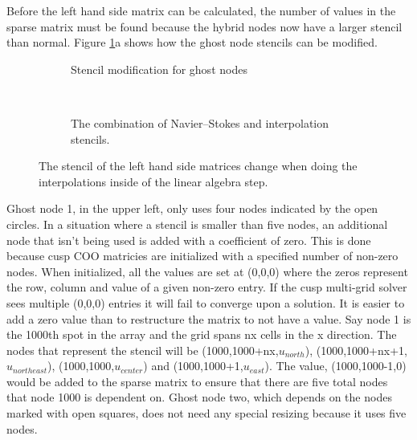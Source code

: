 Before the left hand side matrix can be calculated, the number of values in the sparse matrix must be found because the hybrid nodes now have a larger stencil than normal. 
Figure \ref{fig:ID combined stencil}a shows how the ghost node stencils can be modified. 
\begin{figure}[!htb]
	\centering
	\begin{subfigure}{0.4\textwidth}
		
		\caption{Stencil modification for ghost nodes}		
	\end{subfigure}
	~
	\begin{subfigure}{0.4\textwidth}
		
		\caption{The combination of Navier--Stokes and interpolation stencils.}		
	\end{subfigure}
	\caption{The stencil of the left hand side matrices change when doing the interpolations inside of the linear algebra step.}
	\label{fig:ID combined stencil}
\end{figure}
Ghost node 1, in the upper left, only uses four nodes indicated by the open circles. 
In a situation where a stencil is smaller than five nodes, an additional node that isn't being used is added with a coefficient of zero.
This is done because cusp COO matricies are initialized with a specified number of non-zero nodes.
When initialized, all the values are set at (0,0,0) where the zeros represent the row, column and value of a given non-zero entry.
If the cusp multi-grid solver sees multiple (0,0,0) entries it will fail to converge upon a solution.
It is easier to add a zero value than to restructure the matrix to not have a value.
Say node 1 is the 1000th spot in the array and the grid spans nx cells in the x direction.
The nodes that represent the stencil will be (1000,1000+nx,$u_{north}$), (1000,1000+nx+1,$u_{north east}$), (1000,1000,$u_{center}$) and (1000,1000+1,$u_{east}$). 
The value, (1000,1000-1,0) would be added to the sparse matrix to ensure that there are five total nodes that node 1000 is dependent on. 
Ghost node two, which depends on the nodes marked with open squares, does not need any special resizing because it uses five nodes. 

